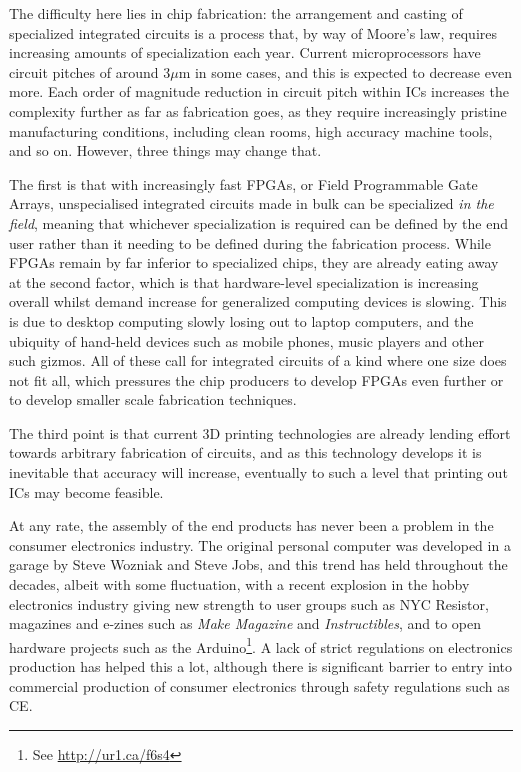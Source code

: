 The dif\hbox{}f\hbox{}iculty here lies in chip fabrication: the arrangement and
casting of specialized integrated circuits is a process that, by way of Moore's
law, requires increasing amounts of specialization each year. Current
microprocessors have circuit pitches of around 3$\mu$m in some cases, and this
is expected to decrease even more. Each order of magnitude reduction in circuit
pitch within ICs increases the complexity further as far as fabrication goes, as
they require increasingly pristine manufacturing conditions, including clean
rooms, high accuracy machine tools, and so on. However, three things may change
that.

The f\hbox{}irst is that with increasingly fast FPGAs, or F\hbox{}ield
Programmable Gate Arrays, unspecialised integrated circuits made in bulk can be
specialized \textit{in the f\hbox{}ield}, meaning that whichever specialization
is required can be def\hbox{}ined by the end user rather than it needing to be
def\hbox{}ined during the fabrication process. While FPGAs remain by far
inferior to specialized chips, they are already eating away at the second
factor, which is that hardware-level specialization is increasing overall 
whilst demand increase for generalized computing devices is slowing. This is 
due to desktop computing slowly losing out to laptop computers, and the 
ubiquity of hand-held devices such as mobile phones, music players and other
such gizmos.  All of these call for integrated circuits of a kind where one 
size does not f\hbox{}it all, which pressures the chip producers to develop
FPGAs even further or to develop smaller scale fabrication techniques. 

The third point is that current 3D printing technologies are already lending
ef\hbox{}fort towards arbitrary fabrication of circuits, and as this technology
develops it is inevitable that accuracy will increase, eventually to such a
level that printing out ICs may become feasible.

At any rate, the assembly of the end products has never been a problem in the
consumer electronics industry. The original personal computer was developed in 
a garage by Steve Wozniak and Steve Jobs, and this trend has held throughout 
the decades, albeit with some f\hbox{}luctuation, with a recent explosion in 
the hobby electronics industry giving new strength to user groups such as NYC
Resistor, magazines and e-zines such as \textit{Make Magazine} and
\textit{Instructibles}, and to open hardware projects such as the
Arduino\footnote{See \url{http://ur1.ca/f6s4}}. A lack of strict
regulations on electronics production has helped this a lot, although there is
signif\hbox{}icant barrier to entry into commercial production of consumer
electronics through safety regulations such as CE.



